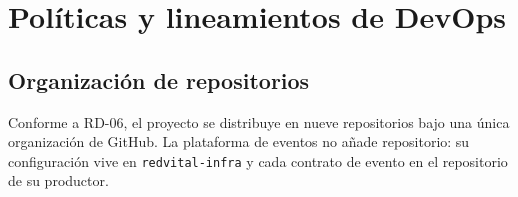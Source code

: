 \documentclass[11pt,a4paper]{article}
\begin{document}
\section{Políticas y lineamientos de DevOps}
\label{sec:devops}

\subsection{Organización de repositorios}

Conforme a RD-06, el proyecto se distribuye en nueve repositorios bajo una única organización de GitHub. La plataforma de eventos no añade repositorio: su configuración vive en \texttt{redvital-infra} y cada contrato de evento en el repositorio de su productor.
\end{document}
